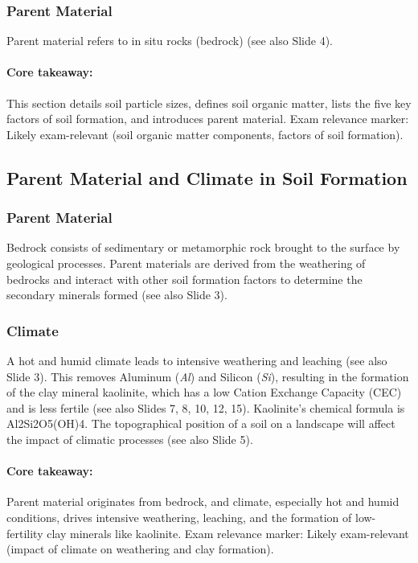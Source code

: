\subsubsection{Parent Material} 
Parent material refers to in situ rocks (bedrock) (see also Slide 4).

\paragraph*{Core takeaway:} 
This section details soil particle sizes, defines soil organic matter, lists the five key factors of soil formation, and introduces parent material. Exam relevance marker: Likely exam-relevant (soil organic matter components, factors of soil formation).

\subsection{Parent Material and Climate in Soil Formation} \subsubsection{Parent Material} 
Bedrock consists of sedimentary or metamorphic rock brought to the surface by geological processes. Parent materials are derived from the weathering of bedrocks and interact with other soil formation factors to determine the secondary minerals formed (see also Slide 3).

\subsubsection{Climate} A hot and humid climate leads to intensive weathering and leaching (see also Slide 3). This removes Aluminum (\textit{Al}) and Silicon (\textit{Si}), resulting in the formation of the clay mineral kaolinite, which has a low Cation Exchange Capacity (CEC) and is less fertile (see also Slides 7, 8, 10, 12, 15). Kaolinite's chemical formula is Al2Si2O5(OH)4. The topographical position of a soil on a landscape will affect the impact of climatic processes (see also Slide 5).

\paragraph*{Core takeaway:} 
Parent material originates from bedrock, and climate, especially hot and humid conditions, drives intensive weathering, leaching, and the formation of low-fertility clay minerals like kaolinite. Exam relevance marker: Likely exam-relevant (impact of climate on weathering and clay formation).

